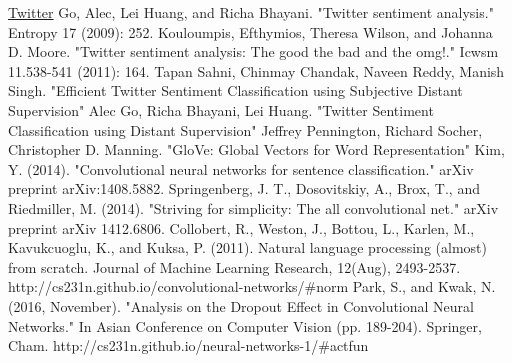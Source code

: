 \documentclass[10pt,conference,compsocconf]{IEEEtran}
\begin{document}
\begin{thebibliography}{99}

	 \href{http://twitter.com}{Twitter}
	 Go, Alec, Lei Huang, and Richa Bhayani. "Twitter sentiment analysis." Entropy 17 (2009): 252.
	 Kouloumpis, Efthymios, Theresa Wilson, and Johanna D. Moore. "Twitter sentiment analysis: The good the bad and the omg!." Icwsm 11.538-541 (2011): 164.
	 Tapan Sahni, Chinmay Chandak, Naveen Reddy, Manish Singh. "Efficient Twitter Sentiment Classification using Subjective Distant Supervision"
	 Alec Go, Richa Bhayani,	Lei Huang. "Twitter Sentiment Classification using Distant Supervision"
	 Jeffrey Pennington, Richard Socher, Christopher D. Manning. "GloVe: Global Vectors for Word Representation"
	  Kim, Y. (2014). "Convolutional neural networks for sentence classification." arXiv preprint arXiv:1408.5882.
	 Springenberg, J. T., Dosovitskiy, A., Brox, T., and Riedmiller, M. (2014). "Striving for simplicity: The all convolutional net." arXiv preprint arXiv 1412.6806.
	 Collobert, R., Weston, J., Bottou, L., Karlen, M., Kavukcuoglu, K., and Kuksa, P. (2011). Natural language processing (almost) from scratch. Journal of Machine Learning Research, 12(Aug), 2493-2537.
	 http://cs231n.github.io/convolutional-networks/{\#}norm
	 Park, S., and Kwak, N. (2016, November). "Analysis on the Dropout Effect in Convolutional Neural Networks." In Asian Conference on Computer Vision (pp. 189-204). Springer, Cham.
	 http://cs231n.github.io/neural-networks-1/{\#}actfun
\end{thebibliography}
\end{document}
